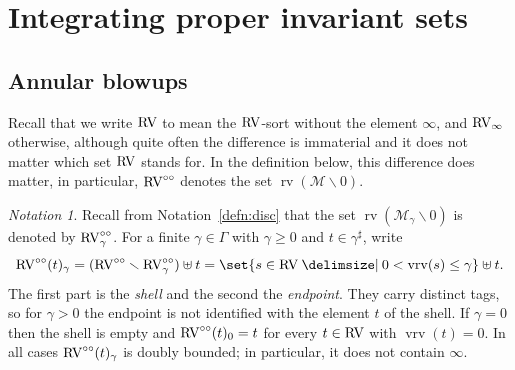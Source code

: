 \documentclass[12pt]{amsart}
\newcommand{\memph}[1]{{\color{magenta}\emph{#1}}}
\theoremstyle{plain}
\theoremstyle{definition}
\theoremstyle{remark}
\newtheorem{nota}[thm]{Notation}
\numberwithin{equation}{section}
\theoremstyle{plain}
\newcommand{\RV}{\textup{RV}}
\newcommand{\MM}{\mdl M}
\newcommand{\0}{\emptyset}
\newcommand{\mdl}[1]{\mathcal{#1}}  %
\newcommand{\fun}{\longrightarrow}
\newcommand{\efun}{\longmapsto}
\newcommand{\mi}{\smallsetminus}
\providecommand\given{}
\newcommand\SetSymbol[1][]{%
\nonscript \: #1 \vert
\allowbreak
\nonscript\:
\mathopen{}}
\renewcommand\given{\SetSymbol[\delimsize]}
\DeclareMathOperator{\rv}{rv}
\DeclareMathOperator{\vrv}{vrv}
\newcommand{\ccirc}{\circ \circ}
\begin{document}
\section{Integrating proper invariant sets}
\label{section:int}

\subsection{Annular blowups}
Recall that we write $\RV$ to mean the $\RV$-sort without the  element $\infty$, and $\RV_\infty$ otherwise, although quite often the difference is immaterial and it does not matter which set $\RV$ stands for. In the definition below, this difference does matter, in particular, $\RV^{\ccirc}$ denotes the set $\rv(\MM \mi 0)$.

\begin{nota}\label{punc:RVd}
Recall from Notation~\ref{defn:disc} that the set $\rv(\MM_{\gamma} \mi 0)$ is denoted by $\RV^{\ccirc}_\gamma$. For a finite $\gamma \in \Gamma$ with $\gamma \geq 0$ and $t \in \gamma^\sharp$, write
\[
\RV^{\ccirc}(t)_\gamma = (\RV^{\ccirc} \mi \RV^{\ccirc}_\gamma) \uplus t = \set{s \in \RV \given 0 < \vrv(s) \leq \gamma} \uplus t.
\]
The first part is the \memph{shell} and the second the \memph{endpoint}. They carry distinct tags, so for $\gamma > 0$ the endpoint is not identified with the element $t$ of the shell. If $\gamma = 0$ then the shell is empty and $\RV^{\ccirc}(t)_0 = t$ for every $t \in \RV$ with $\vrv(t) = 0$. In all cases $\RV^{\ccirc}(t)_\gamma$ is doubly bounded; in particular, it does not contain $\infty$.
\end{nota}

\end{document}
